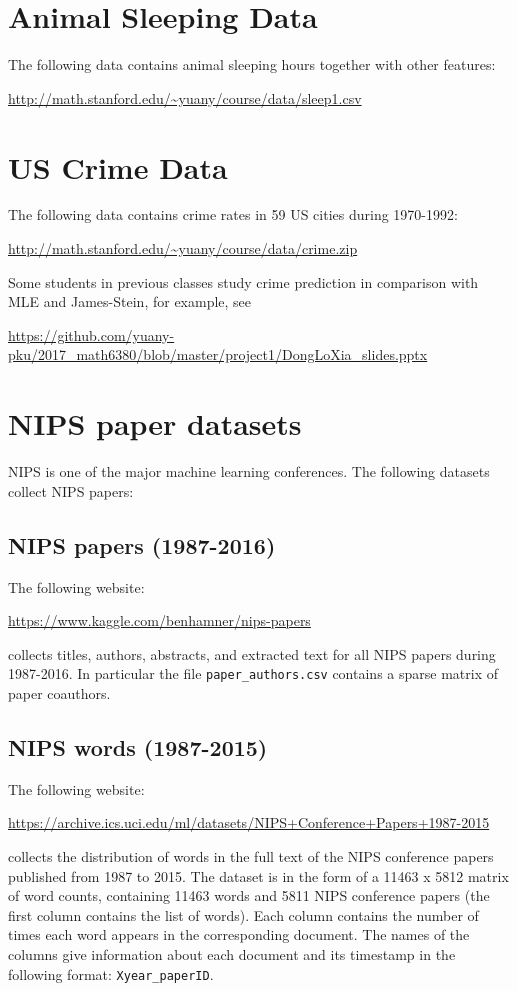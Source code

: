 \documentclass[11pt]{article}
\begin{document}
\section{Animal Sleeping Data} The following data contains animal sleeping hours together with other features: 

\url{http://math.stanford.edu/~yuany/course/data/sleep1.csv}


\section{US Crime Data} The following data contains crime rates in 59 US cities during 1970-1992:

\url{http://math.stanford.edu/~yuany/course/data/crime.zip}

\noindent Some students in previous classes study crime prediction in comparison with MLE and James-Stein, for example, see

\url{https://github.com/yuany-pku/2017_math6380/blob/master/project1/DongLoXia_slides.pptx}


\section{NIPS paper datasets}
NIPS is one of the major machine learning conferences. The following datasets collect NIPS papers:

\subsection{NIPS papers (1987-2016)} The following website: 

\url{https://www.kaggle.com/benhamner/nips-papers}

\noindent collects titles, authors, abstracts, and extracted text for all NIPS papers during 1987-2016. In particular the file {\texttt{paper\_authors.csv}} contains a sparse matrix of paper coauthors. 

\subsection{NIPS words (1987-2015)} The following website:

\url{https://archive.ics.uci.edu/ml/datasets/NIPS+Conference+Papers+1987-2015}

\noindent collects the distribution of words in the full text of the NIPS conference papers published from 1987 to 2015. The dataset is in the form of a 11463 x 5812 matrix of word counts, containing 11463 words and 5811 NIPS conference papers (the first column contains the list of words). Each column contains the number of times each word appears in the corresponding document. The names of the columns give information about each document and its timestamp in the following format: {\texttt{Xyear\_paperID}}. 
\end{document}
